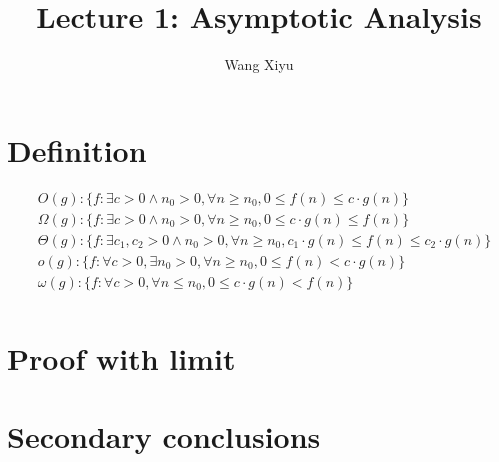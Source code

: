 \documentclass{article}
\begin{document}
\title{Lecture 1: Asymptotic Analysis}
\author{Wang Xiyu}
\date{}
\maketitle
\section{Definition}
\begin{align*}
    &O(g): \{f: \exists c > 0 \land n_0 > 0, \forall n \geq n_0, 0 \leq f(n) \leq c \cdot g(n)\} \\
    &\Omega(g): \{f: \exists c > 0 \land n_0 > 0, \forall n \geq n_0, 0 \leq c \cdot g(n) \leq f(n)\} \\
    &\Theta(g): \{f: \exists c_1, c_2 > 0 \land n_0 > 0, \forall n \geq n_0, c_1 \cdot g(n) \leq f(n) \leq c_2 \cdot g(n)\} \\
    &o(g): \{f: \forall c > 0, \exists n_0 > 0, \forall n \geq n_0, 0 \leq f(n) < c \cdot g(n)\} \\ 
    &\omega(g): \{f: \forall c > 0, \forall n \leq n_0, 0 \leq c \cdot g(n) < f(n)\} \\
\end{align*}
\section{Proof with limit}

\section{Secondary conclusions}
\end{document}
